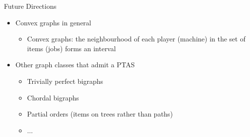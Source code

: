 \begin{frame}[t]{Future Directions}

	\begin{itemize}
    	\item<1-> Convex graphs in general 
    	    \begin{itemize}
    	        \item<2-> Convex graphs: the neighbourhood of each player (machine) in the set of items (jobs) forms an interval
    	    \end{itemize}
        \item<3-> Other graph classes that admit a PTAS
        	\begin{itemize}
            	\item<4-> Trivially perfect bigraphs
                \item<5-> Chordal bigraphs
                \item<6-> Partial orders (items on trees rather than paths)
                \item<7-> $\ldots$
            \end{itemize}
    \end{itemize}
\end{frame}

